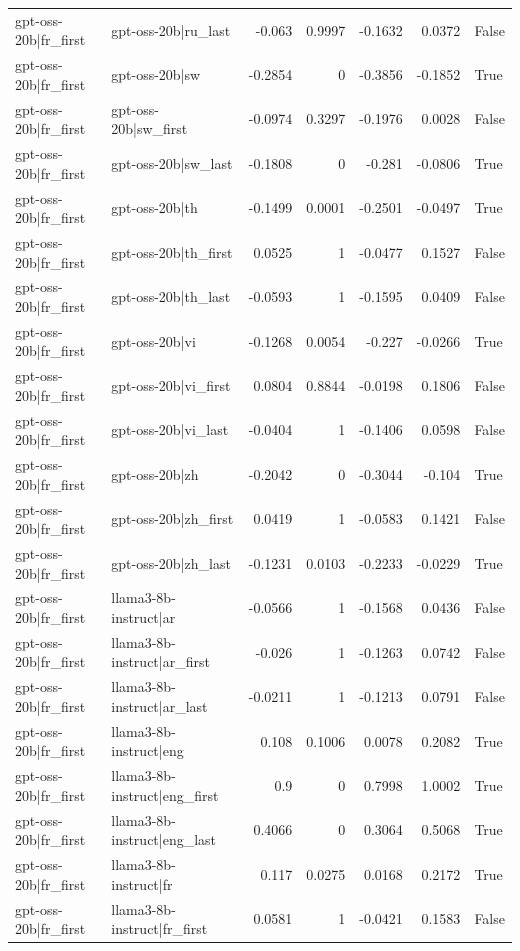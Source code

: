 \begin{table}
\begin{tabular}{l l r r r r l}
gpt-oss-20b|fr_first & gpt-oss-20b|ru_last & -0.063 & 0.9997 & -0.1632 & 0.0372 & False \\
gpt-oss-20b|fr_first & gpt-oss-20b|sw & -0.2854 & 0 & -0.3856 & -0.1852 & True \\
gpt-oss-20b|fr_first & gpt-oss-20b|sw_first & -0.0974 & 0.3297 & -0.1976 & 0.0028 & False \\
gpt-oss-20b|fr_first & gpt-oss-20b|sw_last & -0.1808 & 0 & -0.281 & -0.0806 & True \\
gpt-oss-20b|fr_first & gpt-oss-20b|th & -0.1499 & 0.0001 & -0.2501 & -0.0497 & True \\
gpt-oss-20b|fr_first & gpt-oss-20b|th_first & 0.0525 & 1 & -0.0477 & 0.1527 & False \\
gpt-oss-20b|fr_first & gpt-oss-20b|th_last & -0.0593 & 1 & -0.1595 & 0.0409 & False \\
gpt-oss-20b|fr_first & gpt-oss-20b|vi & -0.1268 & 0.0054 & -0.227 & -0.0266 & True \\
gpt-oss-20b|fr_first & gpt-oss-20b|vi_first & 0.0804 & 0.8844 & -0.0198 & 0.1806 & False \\
gpt-oss-20b|fr_first & gpt-oss-20b|vi_last & -0.0404 & 1 & -0.1406 & 0.0598 & False \\
gpt-oss-20b|fr_first & gpt-oss-20b|zh & -0.2042 & 0 & -0.3044 & -0.104 & True \\
gpt-oss-20b|fr_first & gpt-oss-20b|zh_first & 0.0419 & 1 & -0.0583 & 0.1421 & False \\
gpt-oss-20b|fr_first & gpt-oss-20b|zh_last & -0.1231 & 0.0103 & -0.2233 & -0.0229 & True \\
gpt-oss-20b|fr_first & llama3-8b-instruct|ar & -0.0566 & 1 & -0.1568 & 0.0436 & False \\
gpt-oss-20b|fr_first & llama3-8b-instruct|ar_first & -0.026 & 1 & -0.1263 & 0.0742 & False \\
gpt-oss-20b|fr_first & llama3-8b-instruct|ar_last & -0.0211 & 1 & -0.1213 & 0.0791 & False \\
gpt-oss-20b|fr_first & llama3-8b-instruct|eng & 0.108 & 0.1006 & 0.0078 & 0.2082 & True \\
gpt-oss-20b|fr_first & llama3-8b-instruct|eng_first & 0.9 & 0 & 0.7998 & 1.0002 & True \\
gpt-oss-20b|fr_first & llama3-8b-instruct|eng_last & 0.4066 & 0 & 0.3064 & 0.5068 & True \\
gpt-oss-20b|fr_first & llama3-8b-instruct|fr & 0.117 & 0.0275 & 0.0168 & 0.2172 & True \\
gpt-oss-20b|fr_first & llama3-8b-instruct|fr_first & 0.0581 & 1 & -0.0421 & 0.1583 & False \\

\end{tabular}
\end{table}
